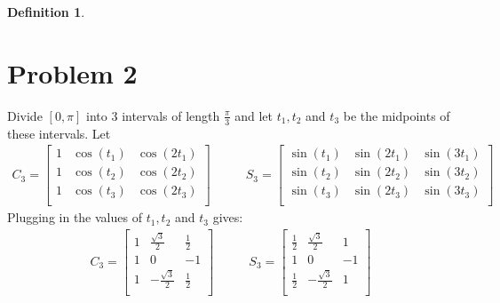 \documentclass[paper=a4, fontsize=11pt]{scrartcl} %
\numberwithin{equation}{section} %
\numberwithin{figure}{section} %
\numberwithin{table}{section} %
\theoremstyle{definition}
\newtheorem*{definition}{Definition}
\begin{document}
\begin{definition}
\section*{Problem 2}
Divide $\left[ 0, \pi \right]$ into 3 intervals of length $\frac{\pi}{3}$ and let $t_1, t_2$ and $t_3$ be the midpoints of these intervals.
Let
\begin{align*}
C_3 =  
  \begin{bmatrix}
   1 & \cos (t_1) & \cos (2t_1) \\
   1 & \cos (t_2) & \cos (2t_2) \\
   1 & \cos (t_3) & \cos (2t_3) \\
  \end{bmatrix} & \qquad S_3 = 
  \begin{bmatrix}
   \sin (t_1) & \sin (2t_1) & \sin (3t_1) \\
   \sin (t_2) & \sin (2t_2) & \sin (3t_2) \\
   \sin (t_3) & \sin (2t_3) & \sin (3t_3) \\
  \end{bmatrix}
\end{align*}
Plugging in the values of $t_1, t_2$ and $t_3$ gives: 
\begin{align*}
  C_3 = 
  \begin{bmatrix}
  1 & \frac{\sqrt{3}}{2} & \frac{1}{2}\\
  1 & 0 & -1 \\
  1 & -\frac{\sqrt{3}}{2} & \frac{1}{2} \\
\end{bmatrix} & \qquad S_3 = 
\begin{bmatrix}
  \frac{1}{2} & \frac{\sqrt{3}}{2} & 1 \\
  1 & 0 & -1 \\
  \frac{1}{2} & -\frac{\sqrt{3}}{2} & 1\\
\end{bmatrix}
\end{align*}


\end{definition}
\end{document}
